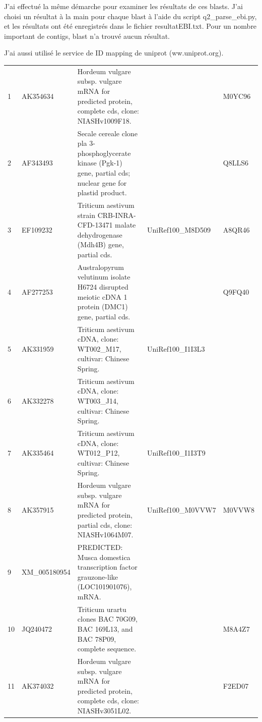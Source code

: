 \documentclass[10.9pt]{article} %
\begin{document}
J'ai effectué la même démarche pour examiner les résultats de ces blasts. J'ai choisi un résultat à la main pour
chaque blast à l'aide du script q2\_parse\_ebi.py, et les résultats ont été enregistrés dans le fichier resultatEBI.txt.
Pour un nombre important de contigs, blast n'a trouvé aucun résultat.

J'ai aussi utilisé le service de ID mapping de uniprot (ww.uniprot.org).



\footnotesize{
\begin{longtable}{|p{1.3cm}|p{1.8cm}|p{6.2cm}|p{3.8cm}|p{2cm}|}
\hline
\centering{\bf{Contig}} & \centering{\bf{Accession}} & \centering{\bf{Description}} & \centering{\bf{Uniref - EBI}} & \centering{\bf{Uniref - mapping}} \\
\endhead \hline 
1 & AK354634 & Hordeum vulgare subsp. vulgare mRNA for predicted protein, complete cds, clone: NIASHv1009F18. &  & M0YC96\\
\hline
2 & AF343493 & Secale cereale clone pla 3-phosphoglycerate kinase (Pgk-1) gene, partial cds; nuclear gene for plastid product. &  & Q8LLS6\\
\hline
3 & EF109232 & Triticum aestivum strain CRB-INRA-CFD-13471 malate dehydrogenase (Mdh4B) gene, partial cds. & UniRef100\_M8D509 & A8QR46\\
\hline
4 & AF277253 & Australopyrum velutinum isolate H6724 disrupted meiotic cDNA 1 protein (DMC1) gene, partial cds. &  & Q9FQ40\\
\hline
5 & AK331959 & Triticum aestivum cDNA, clone: WT002\_M17, cultivar: Chinese Spring. & UniRef100\_I1I3L3 & \\
\hline
6 & AK332278 & Triticum aestivum cDNA, clone: WT003\_J14, cultivar: Chinese Spring. &  & \\
\hline
7 & AK335464 & Triticum aestivum cDNA, clone: WT012\_P12, cultivar: Chinese Spring. & UniRef100\_I1I3T9 & \\
\hline
8 & AK357915 & Hordeum vulgare subsp. vulgare mRNA for predicted protein, partial cds, clone: NIASHv1064M07. & UniRef100\_M0VVW7 & M0VVW8\\
\hline
9 & XM\_005180954 & PREDICTED: Musca domestica transcription factor grauzone-like (LOC101901076), mRNA. &  & \\
\hline
10 & JQ240472 & Triticum urartu clones BAC 70G09, BAC 169L13, and BAC 78P09, complete sequence. &  & M8A4Z7\\
\hline
11 & AK374032 & Hordeum vulgare subsp. vulgare mRNA for predicted protein, complete cds, clone: NIASHv3051L02. &  & F2ED07\\

\end{longtable}}
\end{document}
